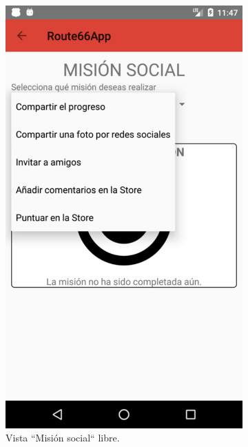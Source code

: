 \documentclass[twoside]{report}
\begin{document}
\begin{figure}[H]
\begin{center}
	\begin{subfigure}[t]{.3\linewidth}
		\includegraphics[scale=0.2]{images/userguide/26.png}
		\caption{Vista “Misión social“ libre.}
	\end{subfigure}\hspace{2mm}%
	\begin{subfigure}[t]{.3\linewidth}

\end{subfigure}
\end{center}
\end{figure}
\end{document}
